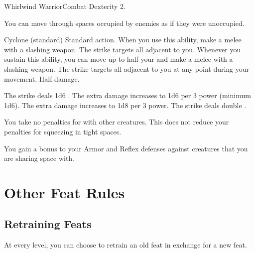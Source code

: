     \begin{feat}{Whirlwind Warrior}{Combat}
        \featpre Dexterity 2.

         You can move through spaces occupied by enemies as if they were unoccupied.

        \begin{sustainability}{Cyclone}{ (standard)}
            \abilityusagetime Standard action.
            \rankline
            When you use this ability, make a melee  with a slashing weapon.
            The strike targets all  adjacent to you.
            Whenever you sustain this ability, you can move up to half your  and make a melee  with a slashing weapon.
            The strike targets all  adjacent to you at any point during your movement.
            \miss Half damage.

            \rankline
             The strike deals 1d6 .
             The extra damage increases to 1d6 per 3 power (minimum 1d6).
             The extra damage increases to 1d8 per 3 power.
             The strike deals double .
        \end{sustainability}

         You take no penalties for \squeezing with other creatures.
        This does not reduce your penalties for squeezing in tight spaces.

         You gain a  bonus to your Armor and Reflex defenses against creatures that you are sharing space with.
    \end{feat}

\section{Other Feat Rules}

    \subsection{Retraining Feats}
        At every level, you can choose to retrain an old feat in exchange for a new feat.
